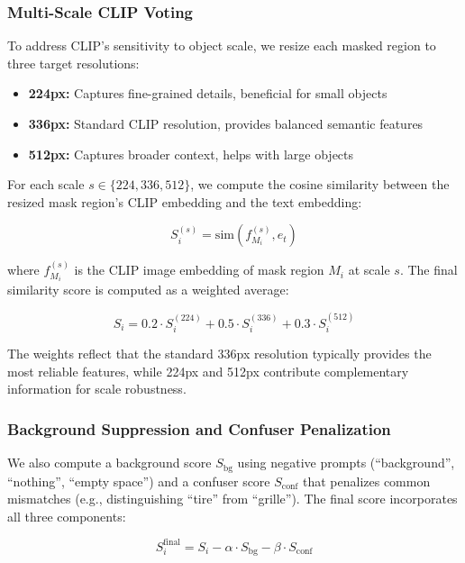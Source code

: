 \subsubsection{Multi-Scale CLIP Voting}

To address CLIP's sensitivity to object scale, we resize each masked region to three target resolutions:
\begin{itemize}
    \item \textbf{224px:} Captures fine-grained details, beneficial for small objects
    \item \textbf{336px:} Standard CLIP resolution, provides balanced semantic features
    \item \textbf{512px:} Captures broader context, helps with large objects
\end{itemize}

For each scale $s \in \{224, 336, 512\}$, we compute the cosine similarity between the resized mask region's CLIP embedding and the text embedding:

\begin{equation}
S_i^{(s)} = \text{sim}(f_{M_i}^{(s)}, e_t)
\end{equation}

where $f_{M_i}^{(s)}$ is the CLIP image embedding of mask region $M_i$ at scale $s$. The final similarity score is computed as a weighted average:

\begin{equation}
S_i = 0.2 \cdot S_i^{(224)} + 0.5 \cdot S_i^{(336)} + 0.3 \cdot S_i^{(512)}
\end{equation}

The weights reflect that the standard 336px resolution typically provides the most reliable features, while 224px and 512px contribute complementary information for scale robustness.

\subsubsection{Background Suppression and Confuser Penalization}

We also compute a background score $S_{\text{bg}}$ using negative prompts (``background'', ``nothing'', ``empty space'') and a confuser score $S_{\text{conf}}$ that penalizes common mismatches (e.g., distinguishing ``tire'' from ``grille''). The final score incorporates all three components:

\begin{equation}
S_i^{\text{final}} = S_i - \alpha \cdot S_{\text{bg}} - \beta \cdot S_{\text{conf}}
\end{equation}

